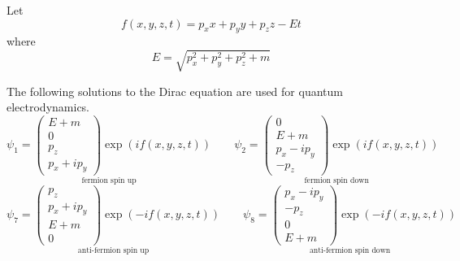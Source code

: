\documentclass[12pt]{article}
\begin{document}
\noindent
Let
\begin{equation*}
f(x,y,z,t)=p_xx+p_yy+p_zz-Et
\end{equation*}
where
\begin{equation*}
E=\sqrt{p_x^2+p_y^2+p_z^2+m}
\end{equation*}

\noindent
The following solutions to the Dirac equation are used for quantum electrodynamics.
\begin{equation*}
\underset{\text{fermion spin up}}
{
\psi_1=\begin{pmatrix}E+m\\0\\p_z\\p_x+ip_y\end{pmatrix}
\exp(if(x,y,z,t))
}
\qquad
\underset{\text{fermion spin down}}
{
\psi_2=\begin{pmatrix}0\\E+m\\p_x-ip_y\\-p_z\end{pmatrix}
\exp(if(x,y,z,t))
}
\end{equation*}
\begin{equation*}
\underset{\text{anti-fermion spin up}}
{
\psi_7=\begin{pmatrix}p_z\\p_x+ip_y\\E+m\\0\end{pmatrix}
\exp(-if(x,y,z,t))
}
\qquad
\underset{\text{anti-fermion spin down}}
{
\psi_8=\begin{pmatrix}p_x-ip_y\\-p_z\\0\\E+m\end{pmatrix}
\exp(-if(x,y,z,t))
}
\end{equation*}
\end{document}

